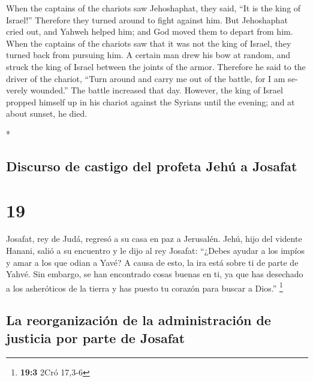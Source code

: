 \begin{paracol}{2}
\begin{otherlanguage}{english}
 When the captains of the chariots saw Jehoshaphat, they
said, ``It is the king of Israel!'' Therefore they turned around to
fight against him. But Jehoshaphat cried out, and Yahweh helped him; and
God moved them to depart from him.  When the captains of
the chariots saw that it was not the king of Israel, they turned back
from pursuing him.  A certain man drew his bow at random,
and struck the king of Israel between the joints of the armor. Therefore
he said to the driver of the chariot, ``Turn around and carry me out of
the battle, for I am severely wounded.''  The battle
increased that day. However, the king of Israel propped himself up in
his chariot against the Syrians until the evening; and at about sunset,
he died.

\end{otherlanguage}

\switchcolumn[0]*

\hypertarget{discurso-de-castigo-del-profeta-jehuxfa-a-josafat}{%
\subsection{Discurso de castigo del profeta Jehú a
Josafat}\label{discurso-de-castigo-del-profeta-jehuxfa-a-josafat}}

\hypertarget{section-36}{%
\section{19}\label{section-36}}

 Josafat, rey de Judá, regresó a su casa en paz a
Jerusalén.  Jehú, hijo del vidente Hanani, salió a su
encuentro y le dijo al rey Josafat: ``¿Debes ayudar a los impíos y amar
a los que odian a Yavé? A causa de esto, la ira está sobre ti de parte
de Yahvé.  Sin embargo, se han encontrado cosas buenas en
ti, ya que has desechado a los asheróticos de la tierra y has puesto tu
corazón para buscar a Dios.'' \footnote{\textbf{19:3} 2Cró 17,3-6}

\hypertarget{la-reorganizaciuxf3n-de-la-administraciuxf3n-de-justicia-por-parte-de-josafat}{%
\subsection{La reorganización de la administración de justicia por parte
de
Josafat}\label{la-reorganizaciuxf3n-de-la-administraciuxf3n-de-justicia-por-parte-de-josafat}}


\end{paracol}
